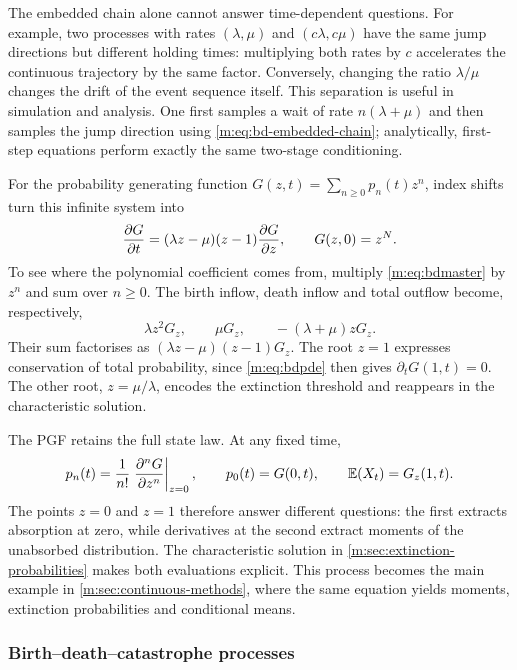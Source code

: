 The embedded chain alone cannot answer time-dependent questions.  For example,
two processes with rates $(\lambda,\mu)$ and $(c\lambda,c\mu)$ have the same jump
directions but different holding times: multiplying both rates by $c$ accelerates
the continuous trajectory by the same factor.  Conversely, changing the ratio
$\lambda/\mu$ changes the drift of the event sequence itself.  This separation is
useful in simulation and analysis.  One first samples a wait of rate
$n(\lambda+\mu)$ and then samples the jump direction using
\cref{m:eq:bd-embedded-chain}; analytically, first-step equations perform exactly
the same two-stage conditioning.

For the probability generating function
$G(z,t)=\sum_{n\geq0}p_n(t)z^n$, index shifts turn this infinite system into
\begin{equation}
  \frac{\partial G}{\partial t}=(\lambda z-\mu)(z-1)\frac{\partial G}{\partial z},
  \qquad G(z,0)=z^N.
  \label{m:eq:bdpde}
\end{equation}
To see where the polynomial coefficient comes from, multiply
\cref{m:eq:bdmaster} by $z^n$ and sum over $n\geq0$.  The birth inflow, death
inflow and total outflow become, respectively,
\begin{equation}
  \lambda z^2G_z,
  \qquad \mu G_z,
  \qquad-(\lambda+\mu)zG_z.
  \label{m:eq:bd-index-shifts}
\end{equation}
Their sum factorises as $(\lambda z-\mu)(z-1)G_z$.  The root $z=1$ expresses
conservation of total probability, since \cref{m:eq:bdpde} then gives
$\partial_tG(1,t)=0$.  The other root, $z=\mu/\lambda$, encodes the extinction
threshold and reappears in the characteristic solution.

The PGF retains the full state law.  At any fixed time,
\begin{equation}
  p_n(t)=\frac{1}{n!}\left.\frac{\partial^nG}{\partial z^n}\right|_{z=0},
  \qquad
  p_0(t)=G(0,t),
  \qquad
  \mathbb{E}\!\left(X_t\right)=G_z(1,t).
  \label{m:eq:bd-pgf-recovery}
\end{equation}
The points $z=0$ and $z=1$ therefore answer different questions: the first
extracts absorption at zero, while derivatives at the second extract moments of
the unabsorbed distribution.  The characteristic solution in
\cref{m:sec:extinction-probabilities} makes both evaluations explicit.
This process becomes the main example in \cref{m:sec:continuous-methods}, where the
same equation yields moments, extinction probabilities and conditional means.

\subsubsection{Birth--death--catastrophe processes}\label{m:sec:bdc}

